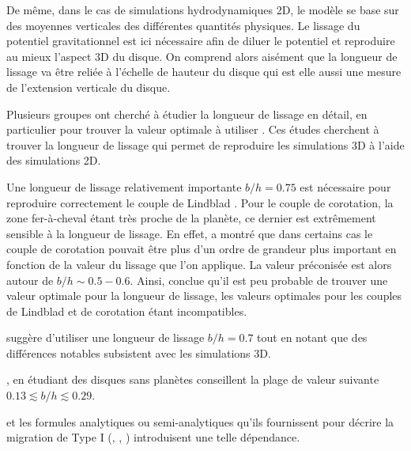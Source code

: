 De même, dans le cas de simulations hydrodynamiques 2D, le modèle se base sur des moyennes verticales des différentes quantités
physiques. Le lissage du potentiel gravitationnel est ici nécessaire afin de diluer le potentiel et reproduire au mieux l'aspect
3D du disque. On comprend alors aisément que la longueur de lissage va être reliée à l'échelle de hauteur du disque qui est elle
aussi une mesure de l'extension verticale du disque. 

Plusieurs groupes ont cherché à étudier la longueur de lissage en détail, en particulier pour trouver la valeur optimale à
utiliser \citep{hure2009local, muller2012treating}. Ces études cherchent à trouver la longueur de lissage qui permet de
reproduire les simulations 3D à l'aide des simulations 2D. 

Une longueur de lissage relativement importante $b/h = 0.75$ est nécessaire pour reproduire correctement le couple de Lindblad
\citep{masset2002coorbital}. Pour le couple de corotation, la zone fer-à-cheval étant très proche de la planète, ce dernier est
extrêmement sensible à la longueur de lissage. En effet, \cite{masset2002coorbital} a montré que dans certains cas le couple de
corotation pouvait être plus d'un ordre de grandeur plus important en fonction de la valeur du lissage que l'on applique. La
valeur préconisée est alors autour de $b/h\sim 0.5-0.6$. Ainsi, \cite{masset2002coorbital} conclue qu'il est peu probable de
trouver une valeur optimale pour la longueur de lissage, les valeurs optimales pour les couples de Lindblad et de corotation
étant incompatibles. 

\cite{muller2012treating} suggère d'utiliser une longueur de lissage $b/h = 0.7$ tout en notant que des différences notables
subsistent avec les simulations 3D. 

\cite{hure2009local}, en étudiant des disques sans planètes conseillent la plage de valeur suivante $0.13 \lesssim b/h \lesssim
0.29$.

\bigskip

\cite{paardekooper2010torque, paardekooper2011torque} et les formules analytiques ou semi-analytiques qu'ils fournissent pour
décrire la migration de Type I (, ,
) introduisent une telle dépendance. 

